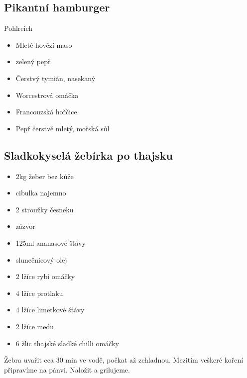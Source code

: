 \documentclass[10pt,a4paper]{article}
\newenvironment{myitemize}
{ \begin{itemize}
    \setlength{\itemsep}{0pt}
    \setlength{\parskip}{0pt}
    \setlength{\parsep}{0pt}     }
{ \end{itemize}                  }
\begin{document}
\subsection{Pikantní hamburger}
\begin{minipage}[t]{0,5\textwidth}
Pohlreich
\begin{myitemize} 
  \item Mleté hovězí maso
  \item zelený pepř
  \item Čerstvý tymián, nasekaný
  \item Worcestrová omáčka
  \item Francouzská hořčice
  \item Pepř čerstvě mletý, mořská sůl 
  
\end{myitemize}
\end{minipage}
\begin{minipage}[t]{0,5\textwidth}

\end{minipage}

\subsection{Sladkokyselá žebírka po thajsku}
\begin{minipage}[t]{0,5\textwidth}
\begin{myitemize} 
  \item 2kg žeber bez kůže
  \item cibulka najemno
  \item 2 stroužky česneku
  \item zázvor
  \item 125ml ananasové šťávy
  \item slunečnicový olej
  \item 2 lžíce rybí omáčky
  \item 4 lžíce protlaku
  \item 4 lžíce limetkové šťávy
  \item 2 lžíce medu
  \item 6 žlic thajské sladké chilli omáčky
  
\end{myitemize}
\end{minipage}
\begin{minipage}[t]{0,5\textwidth}
Žebra uvařit cca 30 min ve vodě, počkat až zchladnou.
Mezitím veškeré koření připravíme na pánvi. Naložit a grilujeme.
\end{minipage}
\end{document}
